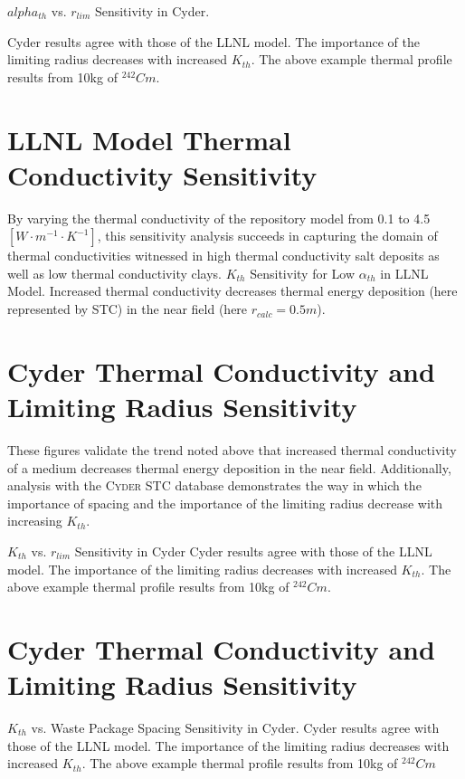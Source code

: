 \documentclass[letterpaper]{article}
\newcommand{\Cyder}{\textsc{Cyder}\xspace}
\begin{document}
{  $alpha_{th}$ vs. $r_{lim}$ Sensitivity in Cyder.

  Cyder results agree with those of the LLNL model. The importance of the 
  limiting radius decreases with increased $K_{th}$. The above example thermal 
  profile results from 10kg of $^{242}Cm$.

\section{LLNL Model Thermal Conductivity Sensitivity}
By varying the thermal conductivity of the repository model from 0.1 to 4.5 
$[W\cdot m^{-1} \cdot K^{-1}]$, this sensitivity analysis succeeds in capturing 
the domain of thermal conductivities witnessed in high thermal conductivity 
salt deposits as well as low thermal conductivity clays.
$K_{th}$ Sensitivity for Low $\alpha_{th}$ in LLNL Model.
Increased thermal conductivity decreases thermal energy deposition 
(here represented by STC) in the near field (here $r_{calc} = 0.5m$).

\section{Cyder Thermal Conductivity and Limiting Radius Sensitivity}

These figures validate the trend noted above that 
increased thermal conductivity of a medium decreases thermal energy deposition 
in the near field. Additionally, analysis with the \Cyder STC database 
demonstrates the way in which the importance of spacing and the importance of 
the limiting radius decrease with increasing $K_{th}$.

$K_{th}$ vs. $r_{lim}$ Sensitivity in Cyder
Cyder results agree with 
those of the LLNL model. The importance of the limiting radius decreases with 
increased $K_{th}$. The above example thermal profile results from 10kg of 
$^{242}Cm$.

\section{Cyder Thermal Conductivity and Limiting Radius Sensitivity}

$K_{th}$ vs. Waste Package Spacing Sensitivity in Cyder.
Cyder results 
agree with 
those of the LLNL model. The importance of the limiting radius decreases with 
increased $K_{th}$. The above example thermal profile results from 10kg of 
$^{242}Cm$




}
\end{document}
